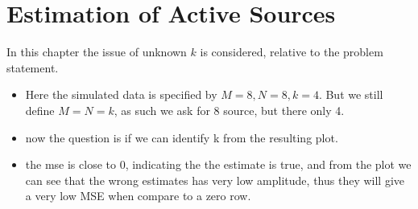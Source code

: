 \chapter{Estimation of Active Sources}
In this chapter the issue of unknown $k$ is considered, relative to the problem statement. 
\begin{itemize}
\item Here the simulated data is specified by $M=8,N=8,k=4$. But we still define $M=N=k$, as such we ask for 8 source, but there only 4. 
\item now the question is if we can identify k from the resulting plot.  
\item the mse is close to 0, indicating the the estimate is true, and from the plot we can see that the wrong estimates has very low amplitude, thus they will give a very low MSE when compare to a zero row.
\end{itemize}

